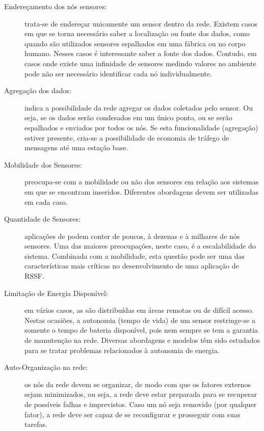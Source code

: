 \begin{description}
	\item[Endereçamento dos nós sensores:] trata-se de endereçar unicamente um sensor dentro da rede. Existem casos em que se torna necessário saber a localização ou fonte dos dados, como quando são utilizados sensores espalhados em uma fábrica ou no corpo humano. Nesses casos é interessante saber a fonte dos dados. Contudo, em casos onde existe uma infinidade de sensores medindo valores no ambiente pode não ser necessário identificar cada nó individualmente.

	\item[Agregação dos dados:] indica a possibilidade da rede agregar os dados coletados pelo sensor. Ou seja, se os dados serão condesados em um único ponto, ou se serão espalhados e enviados por todos os nós. Se esta funcionalidade (agregação) estiver presente, cria-se a possibilidade de economia de tráfego de mensagens até uma estação base.

	\item[Mobilidade dos Sensores: ] preocupa-se com a mobilidade ou não dos sensores em relação aos sistemas em que se encontram inseridos. Diferentes abordagens devem ser utilizadas em cada caso. 

	\item[Quantidade de Sensores:] aplicações de \rssf podem conter de poucos, à dezenas e à milhares de nós sensores. Uma das maiores preocupações, neste caso, é a escalabilidade do sistema. Combinada com a mobilidade, esta questão pode ser uma das características mais críticas no desenvolvimento de uma aplicação de RSSF.

	\item[Limitação de Energia Disponível: ] em vários casos, as \rssfs são distribuídas em áreas remotas ou de difícil acesso. Nestas ocasiões, a autonomia (tempo de vida) de um sensor restringe-se a somente o tempo de bateria disponível, pois nem sempre se tem a garantia de manutenção na rede. Diversas abordagens e modelos têm sido estudados para se tratar problemas relacionados à autonomia de energia.

	\item[Auto-Organização na rede: ] os nós da rede devem se organizar, de modo com que os fatores externos sejam minimizados, ou seja, a rede deve estar preparada para se recuperar de possíveis falhas e imprevistos. Caso um nó seja removido (por qualquer fator), a rede deve ser capaz de se reconfigurar e prosseguir com suas tarefas.


\end{description}
